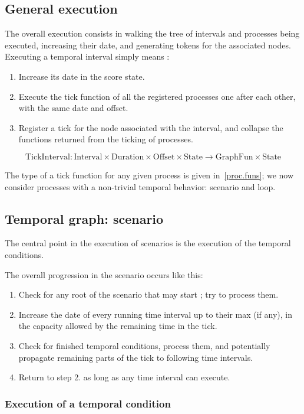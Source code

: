 \documentclass[applsci,article,submit,moreauthors,pdftex,10pt,a4paper]{mdpi}
\begin{document}
\subsection{General execution}
The overall execution consists in walking the tree of intervals and processes being executed, increasing their date, and generating tokens for the associated nodes.
Executing a temporal interval simply means : 

\begin{enumerate}
\item Increase its date in the score state. 
\item Execute the tick function of all the registered processes one after each other, with the same date and offset.
\item Register a tick for the node associated with the interval, and collapse the functions returned from the ticking of processes.
\end{enumerate}
\[
\mathrm{TickInterval}: \mathrm{Interval} \times \mathrm{Duration} \times \mathrm{Offset} \times \mathrm{State} \rightarrow \mathrm{GraphFun} \times \mathrm{State}
\]

The type of a tick function for any given process is given in~\ref{proc.funs}; we now consider processes with a non-trivial temporal behavior: scenario and loop.

\subsection{Temporal graph: scenario}\label{sec.scenario}
The central point in the execution of scenarios is the execution of the temporal conditions. 

The overall progression in the scenario occurs like this: 

\begin{enumerate}
\item Check for any root of the scenario that may start ; try to process them.
\item Increase the date of every running time interval up to their max (if any), in the capacity allowed by the remaining time in the tick.
\item Check for finished temporal conditions, process them, and potentially propagate remaining parts of the tick to following time intervals.
\item Return to step 2. as long as any time interval can execute.
\end{enumerate}
\subsubsection{Execution of a temporal condition}
\end{document}
